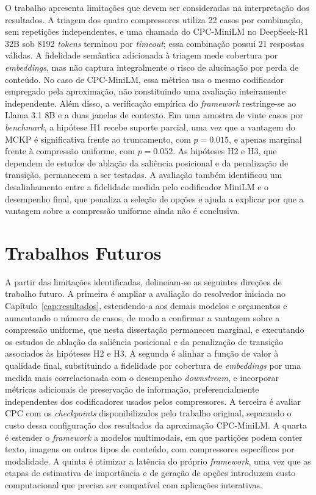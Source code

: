 O trabalho apresenta limitações que devem ser consideradas na interpretação dos resultados. A triagem dos quatro compressores utiliza 22 casos por combinação, sem repetições independentes, e uma chamada do CPC-MiniLM no DeepSeek-R1 32B sob 8192 \textit{tokens} terminou por \textit{timeout}; essa combinação possui 21 respostas válidas. A fidelidade semântica adicionada à triagem mede cobertura por \textit{embeddings}, mas não captura integralmente o risco de alucinação por perda de conteúdo. No caso de CPC-MiniLM, essa métrica usa o mesmo codificador empregado pela aproximação, não constituindo uma avaliação inteiramente independente. Além disso, a verificação empírica do \textit{framework} restringe-se ao Llama 3.1 8B e a duas janelas de contexto. Em uma amostra de vinte casos por \textit{benchmark}, a hipótese H1 recebe suporte parcial, uma vez que a vantagem do MCKP é significativa frente ao truncamento, com $p = 0.015$, e apenas marginal frente à compressão uniforme, com $p = 0.052$. As hipóteses H2 e H3, que dependem de estudos de ablação da saliência posicional e da penalização de transição, permanecem a ser testadas. A avaliação também identificou um desalinhamento entre a fidelidade medida pelo codificador MiniLM e o desempenho final, que penaliza a seleção de opções e ajuda a explicar por que a vantagem sobre a compressão uniforme ainda não é conclusiva.

\section{Trabalhos Futuros}
\label{sec:trabalhos-futuros}

A partir das limitações identificadas, delineiam-se as seguintes direções de trabalho futuro. A primeira é ampliar a avaliação do resolvedor iniciada no Capítulo~\ref{cap:resultados}, estendendo-a aos demais modelos e orçamentos e aumentando o número de casos, de modo a confirmar a vantagem sobre a compressão uniforme, que nesta dissertação permaneceu marginal, e executando os estudos de ablação da saliência posicional e da penalização de transição associados às hipóteses H2 e H3. A segunda é alinhar a função de valor à qualidade final, substituindo a fidelidade por cobertura de \textit{embeddings} por uma medida mais correlacionada com o desempenho \textit{downstream}, e incorporar métricas adicionais de preservação de informação, preferencialmente independentes dos codificadores usados pelos compressores. A terceira é avaliar CPC com os \textit{checkpoints} disponibilizados pelo trabalho original, separando o custo dessa configuração dos resultados da aproximação CPC-MiniLM. A quarta é estender o \textit{framework} a modelos multimodais, em que partições podem conter texto, imagens ou outros tipos de conteúdo, com compressores específicos por modalidade. A quinta é otimizar a latência do próprio \textit{framework}, uma vez que as etapas de estimativa de importância e de geração de opções introduzem custo computacional que precisa ser compatível com aplicações interativas.

